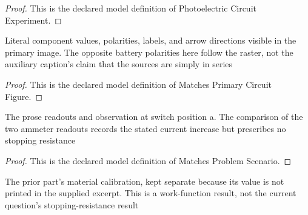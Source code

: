 \begin{proof}
  This is the declared model definition of Photoelectric Circuit Experiment.
\end{proof}
\begin{definition}
  \label{def:physics:phyx-mini-0612:phyxminiproblems-problemphyxmini0612-matchesprimarycircuitfigure}
  Literal component values, polarities, labels, and arrow directions visible in the primary image. The opposite battery polarities here follow the raster, not the auxiliary caption's claim that the sources are simply in series
\end{definition}
\begin{proof}
  This is the declared model definition of Matches Primary Circuit Figure.
\end{proof}
\begin{definition}
  \label{def:physics:phyx-mini-0612:phyxminiproblems-problemphyxmini0612-matchesproblemscenario}
  The prose readouts and observation at switch position a. The comparison of the two ammeter readouts records the stated current increase but prescribes no stopping resistance
\end{definition}
\begin{proof}
  This is the declared model definition of Matches Problem Scenario.
\end{proof}
\begin{definition}
  \label{def:physics:phyx-mini-0612:phyxminiproblems-problemphyxmini0612-usespreviouspartworkfunctionresult}
  The prior part's material calibration, kept separate because its value is not printed in the supplied excerpt. This is a work-function result, not the current question's stopping-resistance result
\end{definition}
